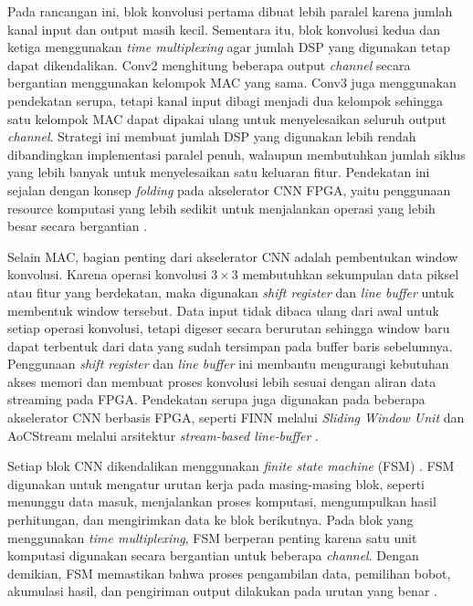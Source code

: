 	Pada rancangan ini, blok konvolusi pertama dibuat lebih
	paralel karena jumlah kanal input dan output masih kecil.
	Sementara itu, blok konvolusi kedua dan ketiga menggunakan
	\emph{time multiplexing} agar jumlah DSP yang digunakan
	tetap dapat dikendalikan. Conv2 menghitung beberapa output
	\emph{channel} secara bergantian menggunakan kelompok MAC
	yang sama. Conv3 juga menggunakan pendekatan serupa, tetapi
	kanal input dibagi menjadi dua kelompok sehingga satu
	kelompok MAC dapat dipakai ulang untuk menyelesaikan seluruh
	output \emph{channel}. Strategi ini membuat jumlah DSP yang
	digunakan lebih rendah dibandingkan implementasi paralel
	penuh, walaupun membutuhkan jumlah siklus yang lebih banyak
	untuk menyelesaikan satu keluaran fitur. Pendekatan ini
	sejalan dengan konsep \emph{folding} pada akselerator CNN
	FPGA, yaitu penggunaan resource komputasi yang lebih sedikit
	untuk menjalankan operasi yang lebih besar secara bergantian
	\cite{Umuroglu2017FINN}.

	Selain MAC, bagian penting dari akselerator CNN adalah
	pembentukan window konvolusi. Karena operasi konvolusi
	$3 \times 3$ membutuhkan sekumpulan data piksel atau fitur
	yang berdekatan, maka digunakan \emph{shift register} dan
	\emph{line buffer} untuk membentuk window tersebut. Data
	input tidak dibaca ulang dari awal untuk setiap operasi
	konvolusi, tetapi digeser secara berurutan sehingga window
	baru dapat terbentuk dari data yang sudah tersimpan pada
	buffer baris sebelumnya. Penggunaan \emph{shift register}
	dan \emph{line buffer} ini membantu mengurangi kebutuhan
	akses memori dan membuat proses konvolusi lebih sesuai
	dengan aliran data streaming pada FPGA. Pendekatan serupa
	juga digunakan pada beberapa akselerator CNN berbasis FPGA,
	seperti FINN melalui \emph{Sliding Window Unit} dan
	AoCStream melalui arsitektur \emph{stream-based line-buffer}
	\cite{Umuroglu2017FINN, Kang2023AoCStream}.

	Setiap blok CNN dikendalikan menggunakan \emph{finite state machine}
	(FSM) \cite{Wakerly2005DigitalDesign}. FSM digunakan untuk mengatur
	urutan kerja pada masing-masing blok, seperti menunggu data masuk,
	menjalankan proses komputasi, mengumpulkan hasil perhitungan, dan
	mengirimkan data ke blok berikutnya. Pada blok yang menggunakan
	\emph{time multiplexing}, FSM berperan penting karena satu unit
	komputasi digunakan secara bergantian untuk beberapa \emph{channel}.
	Dengan demikian, FSM memastikan bahwa proses pengambilan data,
	pemilihan bobot, akumulasi hasil, dan pengiriman output dilakukan
	pada urutan yang benar \cite{Harris2021DigitalDesign}.

